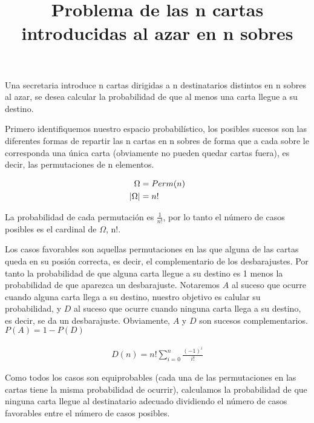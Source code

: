 \documentclass[12pt,spanish]{article}
\title{Problema de las n cartas introducidas al azar en n sobres}
\date{}
\theoremstyle{definition}
\theoremstyle{remark}
\begin{document}
\maketitle

\begin{justify}
  Una secretaria introduce n cartas dirigidas a n destinatarios
  distintos en n sobres al azar, se desea calcular la probabilidad de
  que al menos una carta llegue a su destino.
\end{justify}

\begin{justify}
  Primero identifiquemos nuestro espacio probabilístico, los posibles
  sucesos son las diferentes formas de repartir las n cartas en n
  sobres de forma que a cada sobre le corresponda una única carta
  (obviamente no pueden quedar cartas fuera), es decir, las
  permutaciones de n elementos.
\end{justify}

\begin{align*}
  \Omega&=\mathnormal{Perm}(n)\\
  |\Omega|&=n!
 \end{align*}
    
\begin{justify}
  La probabilidad de cada permutación es $\frac{1}{n!}$, por lo tanto
  el número de casos posibles es el cardinal de $\Omega$, n!.
\end{justify}

\begin{justify}
  Los casos favorables son aquellas permutaciones en las que alguna de
  las cartas queda en su posión correcta, es decir, el complementario
  de los desbarajustes. Por tanto la probabilidad de que alguna carta
  llegue a su destino es 1 menos la probabilidad de que aparezca un
  desbarajuste. Notaremos $A$ al suceso que ocurre cuando alguna carta
  llega a su destino, nuestro objetivo es calular su probabilidad, y
  $D$ al suceso que ocurre cuando ninguna carta llega a su destino, es
  decir, se da un desbarajuste. Obviamente, $A$ y $D$ son sucesos
  complementarios.
  $P(A)=1-P(D)$
\end{justify}

\begin{align*}
  D(n)=n!\sum\limits_{i=0}^n\frac{(-1)^i}{i!}
\end{align*}

\begin{justify}
  Como todos los casos son equiprobables (cada una de las
  permutaciones en las cartas tiene la misma probabilidad de ocurrir),
  calculamos la probabilidad de que ninguna carta llegue al
  destinatario adecuado dividiendo el número de casos favorables entre
  el número de casos posibles.
\end{justify}
\end{document}
